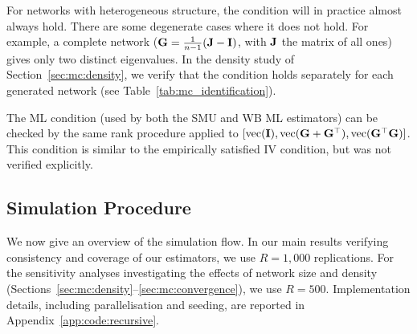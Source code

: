 For networks with heterogeneous structure, the condition will in practice almost always hold. There are some degenerate cases where it does not hold. For example, a complete network ($\mathbf{G} = \frac{1}{n-1}(\mathbf{J} - \mathbf{I})$, with $\mathbf{J}$ the matrix of all ones) gives only two distinct eigenvalues. In the density study of Section~\ref{sec:mc:density}, we verify that the condition holds separately for each generated network (see Table~\ref{tab:mc_identification}).

The ML condition (used by both the SMU and WB ML estimators) can be checked by the same rank procedure applied to $[\operatorname{vec}(\mathbf{I}), \operatorname{vec}(\mathbf{G} + \mathbf{G}^\top), \operatorname{vec}(\mathbf{G}^\top\mathbf{G})]$. This condition is similar to the empirically satisfied IV condition, but was not verified explicitly.

\subsection{Simulation Procedure}
\label{sec:mc:procedure}
We now give an overview of the simulation flow. In our main results verifying consistency and coverage of our estimators, we use $R = 1{,}000$ replications. For the sensitivity analyses investigating the effects of network size and density (Sections~\ref{sec:mc:density}--\ref{sec:mc:convergence}), we use $R = 500$. Implementation details, including parallelisation and seeding, are reported in Appendix~\ref{app:code:recursive}.

